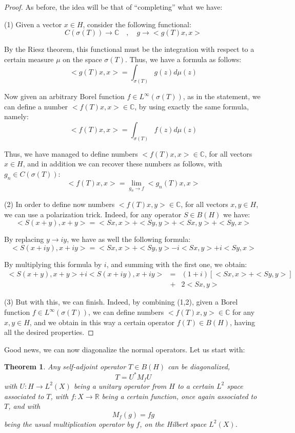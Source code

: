 \documentclass[12pt]{amsbook}
\newtheorem{theorem}{Theorem}[chapter]
\begin{document}
\begin{proof}
As before, the idea will be that of ``completing'' what we have:

\medskip

(1) Given a vector $x\in H$, consider the following functional:
$$C(\sigma(T))\to\mathbb C\quad,\quad 
g\to<g(T)x,x>$$

By the Riesz theorem, this functional must be the integration with respect to a certain measure $\mu$ on the space $\sigma(T)$. Thus, we have a formula as follows:
$$<g(T)x,x>=\int_{\sigma(T)}g(z)d\mu(z)$$

Now given an arbitrary Borel function $f\in L^\infty(\sigma(T))$, as in the statement, we can define a number $<f(T)x,x>\in\mathbb C$, by using exactly the same formula, namely:
$$<f(T)x,x>=\int_{\sigma(T)}f(z)d\mu(z)$$

Thus, we have managed to define numbers $<f(T)x,x>\in\mathbb C$, for all vectors $x\in H$, and in addition we can recover these numbers as follows, with $g_n\in C(\sigma(T))$:
$$<f(T)x,x>=\lim_{g_n\to f}<g_n(T)x,x>$$ 

(2) In order to define now numbers $<f(T)x,y>\in\mathbb C$, for all vectors $x,y\in H$, we can use a polarization trick. Indeed, for any operator $S\in B(H)$ we have:
$$<S(x+y),x+y>=<Sx,x>+<Sy,y>+<Sx,y>+<Sy,x>$$

By replacing $y\to iy$, we have as well the following formula:
$$<S(x+iy),x+iy>=<Sx,x>+<Sy,y>-i<Sx,y>+i<Sy,x>$$

By multiplying this formula by $i$, and summing with the first one, we obtain:
\begin{eqnarray*}
<S(x+y),x+y>+i<S(x+iy),x+iy>
&=&(1+i)[<Sx,x>+<Sy,y>]\\
&+&2<Sx,y>
\end{eqnarray*}

(3) But with this, we can finish. Indeed, by combining (1,2), given a Borel function $f\in L^\infty(\sigma(T))$, we can define numbers $<f(T)x,y>\in\mathbb C$ for any $x,y\in H$, and we obtain in this way a certain operator $f(T)\in B(H)$, having all the desired properties.
\end{proof}

Good news, we can now diagonalize the normal operators. Let us start with:

\begin{theorem}
Any self-adjoint operator $T\in B(H)$ can be diagonalized,
$$T=U^*M_fU$$
with $U:H\to L^2(X)$ being a unitary operator from $H$ to a certain $L^2$ space associated to $T$, with $f:X\to\mathbb R$ being a certain function, once again associated to $T$, and with
$$M_f(g)=fg$$
being the usual multiplication operator by $f$, on the Hilbert space $L^2(X)$.
\end{theorem}
\end{document}
